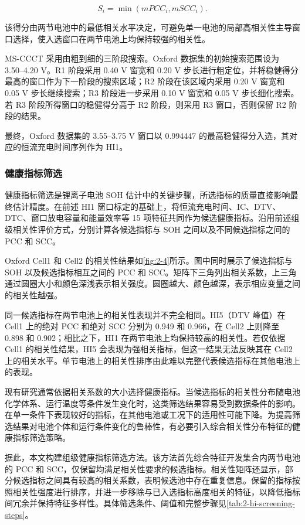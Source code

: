 \begin{equation}
S_i=\min(mPCC_i,mSCC_i).
\end{equation}

该得分由两节电池中的最低相关水平决定，可避免单一电池的局部高相关性主导窗口选择，使入选窗口在两节电池上均保持较强的相关性。

MS-CCCT 采用由粗到细的三阶段搜索。Oxford 数据集的初始搜索范围设为 3.50--4.20 V。R1 阶段采用 0.40 V 窗宽和 0.20 V 步长进行粗定位，并将稳健得分最高的窗口作为下一阶段的搜索区域；R2 阶段在该区域内采用 0.20 V 窗宽和 0.05 V 步长继续搜索；R3 阶段进一步采用 0.10 V 窗宽和 0.05 V 步长细化搜索。若 R3 阶段所得窗口的稳健得分高于 R2 阶段，则采用 R3 窗口，否则保留 R2 阶段的结果。

最终，Oxford 数据集的 3.55--3.75 V 窗口以 0.994447 的最高稳健得分入选，其对应的恒流充电时间序列作为 HI1。

\subsubsection{健康指标筛选}

健康指标筛选是锂离子电池 SOH 估计中的关键步骤\cite{ref60,ref61,ref62}，所选指标的质量直接影响最终估计精度。在前述 HI1 窗口标定的基础上，将恒流充电时间、IC、DTV、DTC、窗口放电容量和能量效率等 15 项特征共同作为候选健康指标。沿用前述组级相关性评价方式，分别计算各候选指标与 SOH 之间以及不同候选指标之间的 PCC 和 SCC。

Oxford Cell1 和 Cell2 的相关性结果如\cref{fig:2-4}所示。图中同时展示了候选指标与 SOH 以及候选指标相互之间的 PCC 和 SCC。矩阵下三角列出相关系数，上三角通过圆圈大小和颜色深浅表示相关强度。圆圈越大、颜色越深，表示相应变量之间的相关性越强。

同一候选指标在两节电池上的相关性表现并不完全相同。HI5（DTV 峰值）在 Cell1 上的绝对 PCC 和绝对 SCC 分别为 0.949 和 0.966，在 Cell2 上则降至 0.898 和 0.902；相比之下，HI1 在两节电池上均保持较高的相关性。若仅依据 Cell1 的相关性结果，HI5 会表现为强相关指标，但这一结果无法反映其在 Cell2 上的相关水平。单节电池上的相关性排序由此难以完整代表候选指标在其他电池上的表现。

现有研究通常依据相关系数的大小选择健康指标。当候选指标的相关性分布随电池化学体系、运行温度等条件发生变化时，这类筛选结果容易受到数据条件的影响。在单一条件下表现较好的指标，在其他电池或工况下的适用性可能下降。为提高筛选结果对电池个体和运行条件变化的鲁棒性，有必要引入综合相关性分布特征的健康指标筛选策略。



据此，本文构建组级健康指标筛选方法。该方法首先综合特征开发集合内两节电池的 PCC 和 SCC，仅保留均满足相关性要求的候选指标。相关性矩阵还显示，部分候选指标之间具有较高的相关系数，表明候选池中存在重复信息。保留的指标按照相关性强度进行排序，并进一步移除与已入选指标高度相关的特征，以降低指标间冗余并保持特征多样性。具体筛选条件、阈值和完整步骤见\cref{tab:2-hi-screening-steps}。


